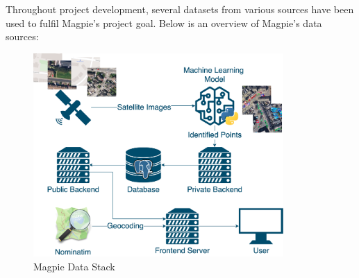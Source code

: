 Throughout project development, several datasets from various sources have been used to fulfil Magpie's project goal. Below is an overview of Magpie's data sources:
\begin{figure}[h!]
    \centering
    \includegraphics[width=0.85\textwidth]{images/magpie-data-stack.png}
    \caption{Magpie Data Stack}
\end{figure}\\

